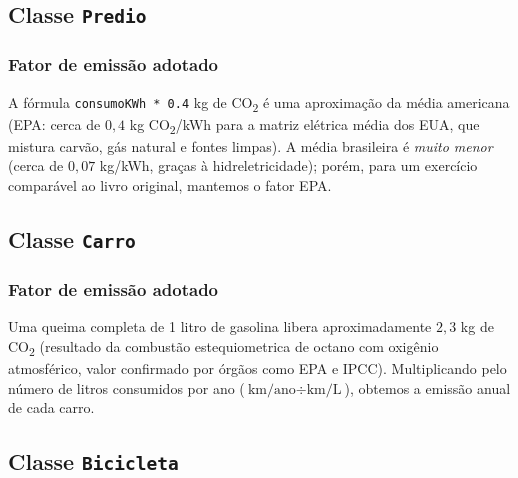 \documentclass[11pt,a4paper]{article}
\begin{document}


\subsection*{Classe \texttt{Predio}}




\subsubsection*{Fator de emiss\~ao adotado}

A f\'ormula \texttt{consumoKWh * 0.4} kg de CO\textsubscript{2} \'e uma aproxima\c{c}\~ao da m\'edia americana (EPA: cerca de $0{,}4$ kg CO\textsubscript{2}/kWh para a matriz el\'etrica m\'edia dos EUA, que mistura carv\~ao, g\'as natural e fontes limpas). A m\'edia brasileira \'e \emph{muito menor} (cerca de $0{,}07$ kg/kWh, gra\c{c}as \`a hidreletricidade); por\'em, para um exerc\'icio compar\'avel ao livro original, mantemos o fator EPA.

\subsection*{Classe \texttt{Carro}}




\subsubsection*{Fator de emiss\~ao adotado}

Uma queima completa de 1 litro de gasolina libera aproximadamente $2{,}3$ kg de CO\textsubscript{2} (resultado da combust\~ao estequiometrica de octano com oxig\^enio atmosf\'erico, valor confirmado por \'org\~aos como EPA e IPCC). Multiplicando pelo n\'umero de litros consumidos por ano ($\text{km/ano} \div \text{km/L}$), obtemos a emiss\~ao anual de cada carro.

\subsection*{Classe \texttt{Bicicleta}}



\end{document}
